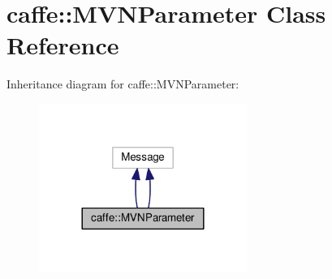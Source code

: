 \hypertarget{classcaffe_1_1_m_v_n_parameter}{}\section{caffe\+:\+:M\+V\+N\+Parameter Class Reference}
\label{classcaffe_1_1_m_v_n_parameter}


Inheritance diagram for caffe\+:\+:M\+V\+N\+Parameter\+:
\nopagebreak
\begin{figure}[H]
\begin{center}
\leavevmode
\includegraphics[width=192pt]{classcaffe_1_1_m_v_n_parameter__inherit__graph}
\end{center}
\end{figure}
